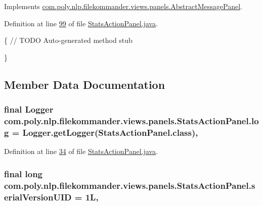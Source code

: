 Implements \hyperlink{classcom_1_1poly_1_1nlp_1_1filekommander_1_1views_1_1panels_1_1_abstract_message_panel_a305ad7e0b41448b92cfc567062fbb874}{com.\-poly.\-nlp.\-filekommander.\-views.\-panels.\-Abstract\-Message\-Panel}.



Definition at line \hyperlink{L99}{99} of file \hyperlink{}{Stats\-Action\-Panel.\-java}.


\begin{DoxyCode}
                                             \{
        \textcolor{comment}{// TODO Auto-generated method stub}
        
    \}
\end{DoxyCode}


\subsection{Member Data Documentation}
\hypertarget{classcom_1_1poly_1_1nlp_1_1filekommander_1_1views_1_1panels_1_1_stats_action_panel_a9d905505e7514da823b65ce32d31d22e}{
\subsubsection[{log}]{\setlength{\rightskip}{0pt plus 5cm}final Logger com.\-poly.\-nlp.\-filekommander.\-views.\-panels.\-Stats\-Action\-Panel.\-log = Logger.\-get\-Logger(Stats\-Action\-Panel.\-class)\hspace{0.3cm}{\ttfamily [static]}, {\ttfamily [private]}}}\label{classcom_1_1poly_1_1nlp_1_1filekommander_1_1views_1_1panels_1_1_stats_action_panel_a9d905505e7514da823b65ce32d31d22e}


Definition at line \hyperlink{L34}{34} of file \hyperlink{}{Stats\-Action\-Panel.\-java}.

\hypertarget{classcom_1_1poly_1_1nlp_1_1filekommander_1_1views_1_1panels_1_1_stats_action_panel_ae7f395a4db15fdb7194b11934cd0732a}{
\subsubsection[{serial\-Version\-U\-I\-D}]{\setlength{\rightskip}{0pt plus 5cm}final long com.\-poly.\-nlp.\-filekommander.\-views.\-panels.\-Stats\-Action\-Panel.\-serial\-Version\-U\-I\-D = 1\-L\hspace{0.3cm}{\ttfamily [static]}, {\ttfamily [private]}}}\label{classcom_1_1poly_1_1nlp_1_1filekommander_1_1views_1_1panels_1_1_stats_action_panel_ae7f395a4db15fdb7194b11934cd0732a}



